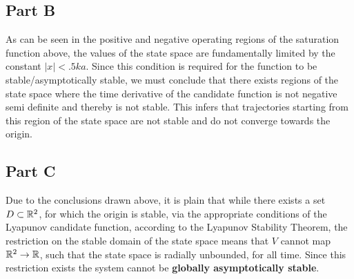 \subsection*{Part B}

\noindent As can be seen in the positive and negative operating regions of the saturation function above, the values of the state space are fundamentally limited by the constant $|x|<.5ka$. Since this condition is required for the function to be stable/asymptotically stable, we must conclude that there exists regions of the state space where the time derivative of the candidate function is not negative semi definite and thereby is not stable. This infers that trajectories starting from this region of the state space are not stable and do not converge towards the origin.


\subsection*{Part C}

\noindent Due to the conclusions drawn above, it is plain that while there exists a set $D \subset \mathbb{R}^2$, for which the origin is stable, via the appropriate conditions of the Lyapunov candidate function, according to the Lyapunov Stability Theorem, the restriction on the stable domain of the state space means that $V$ cannot map $\mathbb{R}^2 \rightarrow \mathbb{R}$, such that the state space is radially unbounded, for all time. Since this restriction exists the system cannot be \textbf{globally asymptotically stable}. 

